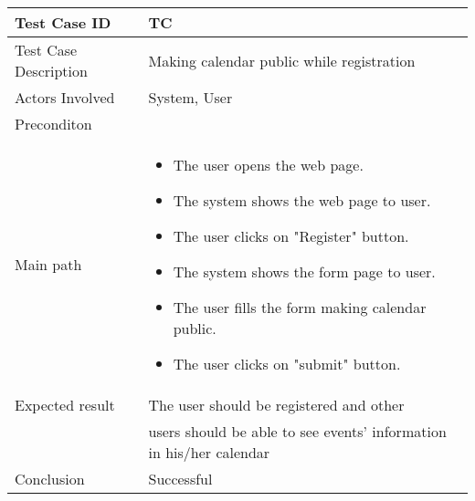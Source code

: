 \begin{center} \begin{tabular}{|l|l|}
  \hline
  Test Case ID &TC \z\\
  \hline
  Test Case Description & Making calendar public while registration\\
  \hline
  Actors Involved & System, User\\
   \hline
  Preconditon & \\
  \hline
  Main path &   \begin{minipage}{5in}
    \vskip 4pt
            \begin{itemize}
              \item The user opens the web page.
              \item The system shows the web page to user.
              \item The user clicks on "Register" button.
              \item The system shows the form page to user.
              \item The user fills the form making calendar public.
              \item The user clicks on "submit" button.
            \end{itemize}
    \vskip 4pt
  \end{minipage}  \\
  \hline
  Expected result & The user should be registered and other \\
  & users should be able to see events' information in his/her calendar\\
  \hline
  Conclusion & Successful\\
  \hline
\end{tabular} \end{center}

